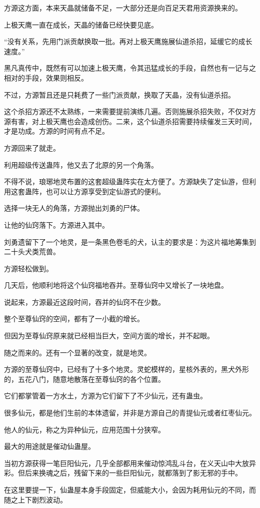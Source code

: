 \begin{this_body}
方源这方面，本来天晶就储备不足，一大部分还是向百足天君用资源换来的。

上极天鹰一直在成长，天晶的储备已经快要见底。

“没有关系，先用门派贡献换取一批。再对上极天鹰施展仙道杀招，延缓它的成长速度。”

黑凡真传中，既然有可以加速上极天鹰，令其迅猛成长的手段，自然也有一记与之相对的手段，效果则相反。

不过，方源暂且还是只耗费了一些门派贡献，换取了天晶，没有仙道杀招。

这个杀招方源还不太熟练，一来需要提前演练几遍。否则施展杀招失败，不仅对方源有害，对上极天鹰也会造成创伤。二来，这个仙道杀招需要持续催发三天时间，才是功成。方源的时间有点不足。

方源回来了就走。

利用超级传送蛊阵，他又去了北原的另一个角落。

不得不说，琅琊地灵布置的这套超级蛊阵实在太方便了。方源缺失了定仙游，但利用这套蛊阵，也可以让方源享受到定仙游式的便利。

选择一块无人的角落，方源抛出刘勇的尸体。

让他的仙窍落下。方源进入其中。

刘勇遗留下了一个地灵，是一条黑色卷毛的犬，认主的要求是：为这片福地筹集到二十头犬类荒兽。

方源轻松做到。

几天后，他顺利地将这个仙窍福地吞并。至尊仙窍中又增长了一块地盘。

说起来，方源最近这段时间，吞并的仙窍不在少数。

整个至尊仙窍的空间，都有了一小截的增长。

但因为至尊仙窍原来就已经相当巨大，空间方面的增长，并不起眼。

随之而来的。还有一个显著的改变，就是地灵。

方源的至尊仙窍中，已经有了十多个地灵。灵蛇模样的，星核外表的，黑犬外形的，五花八门，随意地散落在至尊仙窍的各个位置。

它们都掌管着一方水土，方源为它们留下了不少仙元，还有蛊虫。

很多仙元，都是他们生前的本体遗留，并非是方源自己的青提仙元或者红枣仙元。

他人的仙元，称之为异种仙元，应用范围十分狭窄。

最大的用途就是催动仙蛊屋。

当初方源获得一笔巨阳仙元，几乎全部都用来催动惊鸿乱斗台，在义天山中大放异彩。但后来换魂之后，残留下来的一些巨阳仙元，就都落到了影无邪的手中。

在这里要提一下，仙蛊屋本身手段固定，但威能大小，会因为耗用仙元的不同，而随之上下剧烈波动。


\end{this_body}
